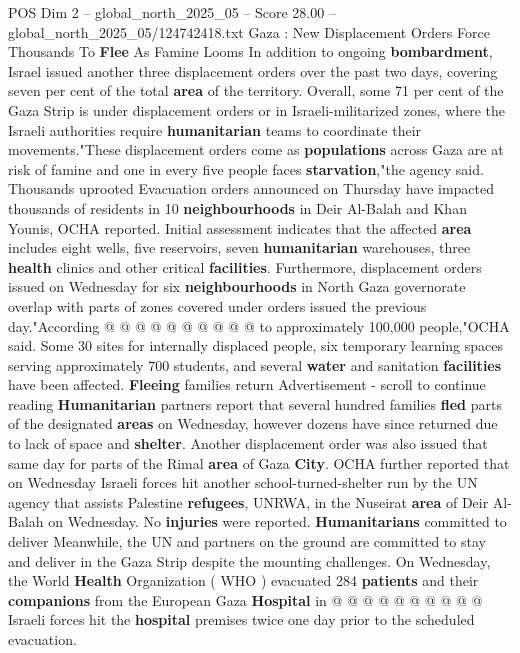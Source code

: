 \begin{textsample}{POS Dim 2 – global\_north\_2025\_05 – Score 28.00 – global\_north\_2025\_05/124742418.txt}  \label{ex:f2_pos_214}
Gaza : New Displacement Orders Force Thousands To \textbf{Flee} As Famine Looms In addition to ongoing \textbf{bombardment}, Israel issued another three displacement orders over the past two days, covering seven per cent of the total \textbf{area} of the territory.
Overall, some 71 per cent of the Gaza Strip is under displacement orders or in Israeli-militarized zones, where the Israeli authorities require \textbf{humanitarian} teams to coordinate their movements."These displacement orders come as \textbf{populations} across Gaza are at risk of famine and one in every five people faces \textbf{starvation},"the agency said.
Thousands uprooted Evacuation orders announced on Thursday have impacted thousands of residents in 10 \textbf{neighbourhoods} in Deir Al-Balah and Khan Younis, OCHA reported.
Initial assessment indicates that the affected \textbf{area} includes eight wells, five reservoirs, seven \textbf{humanitarian} warehouses, three \textbf{health} clinics and other critical \textbf{facilities}.
Furthermore, displacement orders issued on Wednesday for six \textbf{neighbourhoods} in North Gaza governorate overlap with parts of zones covered under orders issued the previous day."According @ @ @ @ @ @ @ @ @ @ to approximately 100,000 people,"OCHA said.
Some 30 sites for internally displaced people, six temporary learning spaces serving approximately 700 students, and several \textbf{water} and sanitation \textbf{facilities} have been affected. \textbf{Fleeing} families return Advertisement - scroll to continue reading \textbf{Humanitarian} partners report that several hundred families \textbf{fled} parts of the designated \textbf{areas} on Wednesday, however dozens have since returned due to lack of space and \textbf{shelter}.
Another displacement order was also issued that same day for parts of the Rimal \textbf{area} of Gaza \textbf{City}.
OCHA further reported that on Wednesday Israeli forces hit another school-turned-shelter run by the UN agency that assists Palestine \textbf{refugees}, UNRWA, in the Nuseirat \textbf{area} of Deir Al-Balah on Wednesday.
No \textbf{injuries} were reported. \textbf{Humanitarians} committed to deliver Meanwhile, the UN and partners on the ground are committed to stay and deliver in the Gaza Strip despite the mounting challenges.
On Wednesday, the World \textbf{Health} Organization ( WHO ) evacuated 284 \textbf{patients} and their \textbf{companions} from the European Gaza \textbf{Hospital} in @ @ @ @ @ @ @ @ @ @ Israeli forces hit the \textbf{hospital} premises twice one day prior to the scheduled evacuation.

\end{textsample}
